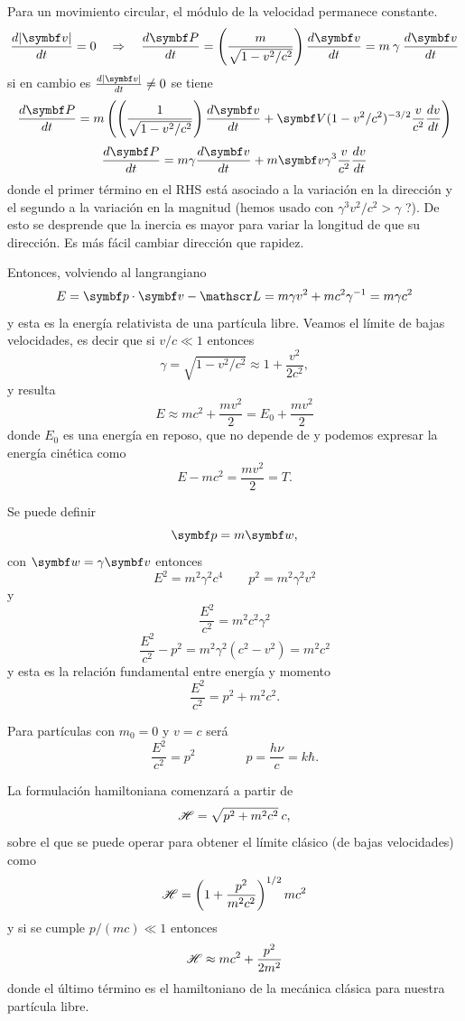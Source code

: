 \documentclass[10pt,oneside]{CBFT_book}
\begin{document}
Para un movimiento circular, el módulo de la velocidad permanece constante.
\[
	\dtot{|\vb{v}|}{t} = 0 \quad \Rightarrow \quad \dtot{\vb{P}}{t} =
		\left( \frac{ m }{\sqrt{1 - v^2/c^2 }}\right) \dtot{\vb{v}}{t} =
		m \: \gamma \: \dtot{\vb{v}}{t}
\]
si en cambio es $ \dtot{|\vb{v}|}{t} \neq 0 $ se tiene 
\[
	\dtot{\vb{P}}{t} = m \left( \left( \frac{ 1 }{\sqrt{1 - v^2/c^2 }}\right) \dtot{\vb{v}}{t} 
	+ \vb{V} (1 - v^2/c^2)^{-3/2} \frac{v}{c^2} \dtot{v}{t} \right)
\]
\[
	\dtot{\vb{P}}{t} = m \gamma \dtot{\vb{v}}{t} + m \vb{v} \gamma^3 \frac{v}{c^2} \dtot{v}{t}
\]
donde el primer término en el RHS está asociado a la variación en la dirección y el segundo a la variación
en la magnitud (hemos usado con $ \gamma^3 v^2/c^2 > \gamma $ ?). De esto se desprende que la inercia es
mayor para variar la longitud de  que su dirección. Es más fácil cambiar dirección que rapidez.

Entonces, volviendo al langrangiano
\[
	E = \pe{p}{v} - \Lag = m \gamma v^2 + m c^2 \gamma^{-1} = m \gamma c^2
\]
y esta es la energía relativista de una partícula libre. 
Veamos el límite de bajas velocidades, es decir
que si $v/c \ll 1$ entonces 
\[
	\gamma = \sqrt{ 1 - v^2/c^2 } \approx 1 + \frac{v^2}{2c^2},
\]
y resulta 
\[
	E \approx  m c^2 + \frac{m v^2}{2} = E_0 + \frac{m v^2}{2}
\]
donde $E_0$ es una energía en reposo, que no depende de  y podemos 
expresar la energía cinética como 
\[
	E - m c^2 = \frac{m v^2}{2} = T.
\]

Se puede definir
\[
	\vb{p} = m \vb{w},
\]
con $\vb{w} = \gamma \vb{v}$ entonces 
\[
	E^2 = m^2 \gamma^2 c^4 \qquad p^2 = m^2 \gamma^2 v^2 
\]
y
\[
	\frac{E^2}{c^2} = m^2 c^2 \gamma^2
\]
\[
	\frac{E^2}{c^2} - p^2 = m^2 \gamma^2 (c^2 -v^2) = m^2 c^2
\]
y esta es la relación fundamental entre energía y momento 
\[
	\frac{E^2}{c^2} = p^2 + m^2c^2.
\]

Para partículas con $m_0 = 0$ y $v=c$ será 
\[
	\frac{E^2}{c^2} = p^2 \qquad \qquad p = \frac{h\nu}{c} = k\hbar.
\]

La formulación hamiltoniana comenzará a partir de 
\[
	\mathscr{H} = \sqrt{ p^2 + m^2 c^2} \: c,
\]
sobre el que se puede operar para obtener el límite clásico (de bajas velocidades) como 
\[
	\mathscr{H} = \left( 1 + \frac{ p^2 }{ m^2 c^2 } \right)^{1/2} m c^2
\]
y si se cumple $ p/(mc) \ll 1$ entonces 
\[
	\mathscr{H} \approx mc^2 + \frac{ p^2 }{2m^2}
\]
donde el último término  es el hamiltoniano de la mecánica clásica para nuestra partícula
libre.
\end{document}

